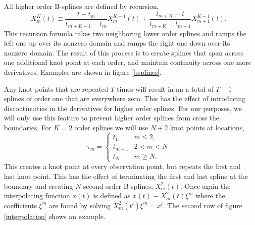 \documentclass[twocol]{ametsoc}
\begin{document}
All higher order B-splines are defined by recursion,
\begin{equation}
X^K_m(t) \equiv \frac{t - t_m}{t_{m+K-1} - t_m} X^{K-1}_m(t) + \frac{t_{m+K}-t}{t_{m+K} - t_{m+1}} X^{K-1}_{m+1}(t).
\end{equation}
This recursion formula takes two neighboring lower order splines and ramps the left one up over its nonzero domain and ramps the right one down over its nonzero domain. The result of this process is to create splines that span across one additional knot point at each order, and maintain continuity across one more derivatives. Examples are shown in figure \ref{bsplines}.

Any knot points that are repeated $T$ times will result in an a total of $T-1$ splines of order one that are everywhere zero. This has the effect of introducing discontinuities in the derivatives for higher order splines. For our purposes, we will only use this feature to prevent higher order splines from cross the boundaries. For $K=2$ order splines we will use $N+2$ knot points at locations,
\begin{equation}
\tau_m = \begin{cases}
t_1      	& \text{$m \leq 2$}, \\
t_{m-1}	& \text{$2 < m < N$}\\
t_N 		& \text{$m \geq N$}.
\end{cases}
\end{equation}
This creates a knot point at every observation point, but repeats the first and last knot point. This has the effect of terminating the first and last spline at the boundary and creating $N$ second order B-splines, $X^2_m(t)$. Once again the interpolating function $x(t)$ is defined as $x(t) \equiv  X^2_m(t) \xi^m$ where the coefficients $\xi^m$ are found by solving $X^2_m(t^i) \xi^m = x^i$. The second row of figure \ref{interpolation} shows an example.
\end{document}
